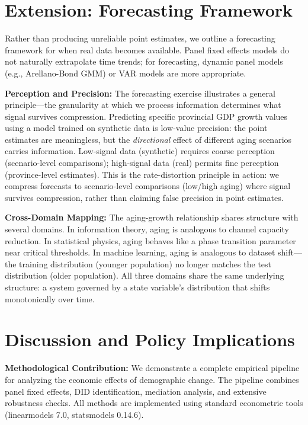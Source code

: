 \documentclass[12pt]{article}
\begin{document}
\section{Extension: Forecasting Framework}

Rather than producing unreliable point estimates, we outline a forecasting framework for when real data becomes available. Panel fixed effects models do not naturally extrapolate time trends; for forecasting, dynamic panel models (e.g., Arellano-Bond GMM) or VAR models are more appropriate.

\textbf{Perception and Precision:} The forecasting exercise illustrates a general principle---the granularity at which we process information determines what signal survives compression. Predicting specific provincial GDP growth values using a model trained on synthetic data is low-value precision: the point estimates are meaningless, but the \textit{directional} effect of different aging scenarios carries information. Low-signal data (synthetic) requires coarse perception (scenario-level comparisons); high-signal data (real) permits fine perception (province-level estimates). This is the rate-distortion principle in action: we compress forecasts to scenario-level comparisons (low/high aging) where signal survives compression, rather than claiming false precision in point estimates.

\textbf{Cross-Domain Mapping:} The aging-growth relationship shares structure with several domains. In information theory, aging is analogous to channel capacity reduction. In statistical physics, aging behaves like a phase transition parameter near critical thresholds. In machine learning, aging is analogous to dataset shift---the training distribution (younger population) no longer matches the test distribution (older population). All three domains share the same underlying structure: a system governed by a state variable's distribution that shifts monotonically over time.

\section{Discussion and Policy Implications}

\textbf{Methodological Contribution:} We demonstrate a complete empirical pipeline for analyzing the economic effects of demographic change. The pipeline combines panel fixed effects, DID identification, mediation analysis, and extensive robustness checks. All methods are implemented using standard econometric tools (linearmodels 7.0, statsmodels 0.14.6).
\end{document}
